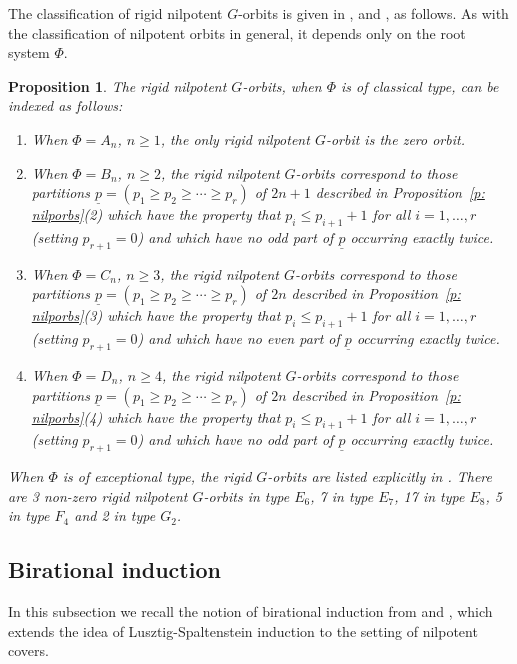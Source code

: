 \documentclass[11pt]{amsart}
\newtheorem{prop}[theorem]{Proposition}
\numberwithin{equation}{section}
\begin{document}
	The classification of rigid nilpotent $G$-orbits is given in \cite[Theorem 7.2.3]{CM}, \cite[Corollary 7.3.5]{CM} and \cite{EdG}, as follows. As with the classification of nilpotent orbits in general, it depends only on the root system $\Phi$.
	
	\begin{prop}\label{p: rignilporbs}
		The rigid nilpotent $G$-orbits, when $\Phi$ is of classical type, can be indexed as follows:
		\begin{enumerate}
			\item When $\Phi=A_n$, $n\geq 1$, the only rigid nilpotent $G$-orbit is the zero orbit.
			\item When $\Phi=B_n$, $n\geq 2$, the rigid nilpotent $G$-orbits correspond to those partitions $\underline{p}=(p_1\geq p_2\geq \cdots\geq p_r)$ of $2n+1$ described in Proposition~\ref{p: nilporbs}(2) which have the property that $p_i\leq p_{i+1}+1$ for all $i=1,\ldots, r$ (setting $p_{r+1}=0$) and which have no odd part of $\underline{p}$ occurring exactly twice.
			\item When $\Phi=C_n$, $n\geq 3$, the rigid nilpotent $G$-orbits correspond to those partitions $\underline{p}=(p_1\geq p_2\geq \cdots\geq p_r)$ of $2n$ described in Proposition~\ref{p: nilporbs}(3) which have the property that $p_i\leq p_{i+1}+1$ for all $i=1,\ldots, r$ (setting $p_{r+1}=0$) and which have no even part of $\underline{p}$ occurring exactly twice.
			\item When $\Phi=D_n$, $n\geq 4$, the rigid nilpotent $G$-orbits correspond to those partitions $\underline{p}=(p_1\geq p_2\geq \cdots\geq p_r)$ of $2n$ described in Proposition~\ref{p: nilporbs}(4) which have the property that $p_i\leq p_{i+1}+1$ for all $i=1,\ldots, r$ (setting $p_{r+1}=0$) and which have no odd part of $\underline{p}$ occurring exactly twice.
		\end{enumerate}
		When $\Phi$ is of exceptional type, the rigid $G$-orbits are listed explicitly in \cite{EdG}. There are  3 non-zero rigid nilpotent $G$-orbits in type $E_6$, 7 in type $E_7$, 17 in type $E_8$, 5 in type $F_4$ and 2 in type $G_2$.
	\end{prop}
	
	
	\subsection{Birational induction}\label{ss: BInd}
	
	In this subsection we recall the notion of birational induction from \cite{LoOM} and \cite{LMM}, which extends the idea of Lusztig-Spaltenstein induction to the setting of nilpotent covers.
	
\end{document}
